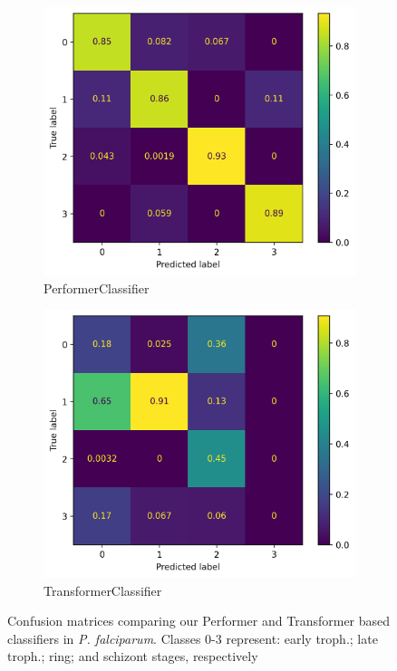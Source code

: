 \documentclass{article}
\begin{document}
\begin{figure}[!h]
  \centering
  \begin{subfigure}[b]{0.4\textwidth}
      \includegraphics[width=\textwidth]{figures/performer_confusion.png}
      \caption{PerformerClassifier}
  \end{subfigure}
  \hfill
  \begin{subfigure}[b]{0.4\textwidth}
      \includegraphics[width=\textwidth]{figures/transformer_confusion.png}
      \caption{TransformerClassifier}
  \end{subfigure}
  \caption{Confusion matrices comparing our Performer and Transformer based classifiers in \textit{P. falciparum}. Classes 0-3 represent: early troph.; late troph.; ring; and schizont stages, respectively}
  \label{fig:pfal_confus}
\end{figure}
\end{document}
